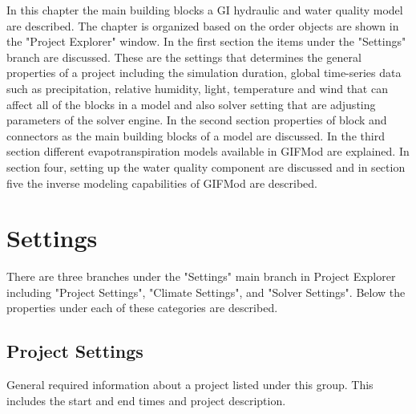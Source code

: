 In this chapter the main building blocks a GI hydraulic and water quality model are described. The chapter is organized based on the order objects are shown in the "Project Explorer" window. In the first section the items under the "Settings" branch are discussed. These are the settings that determines the general properties of a project including the simulation duration, global time-series data such as precipitation, relative humidity, light, temperature and wind that can affect all of the blocks in a model and also solver setting that are adjusting parameters of the solver engine. In the second section properties of block and connectors as the main building blocks of a model are discussed. In the third section different evapotranspiration models available in GIFMod are explained. In section four, setting up the water quality component are discussed and in section five the inverse modeling capabilities of GIFMod are described. 

\section{Settings}
There are three branches under the "Settings" main branch in Project Explorer including "Project Settings", "Climate Settings", and "Solver Settings". Below the properties under each of these categories are described. 
\subsection{Project Settings}
General required information about a project listed under this group. This includes the start and end times and project description. 

